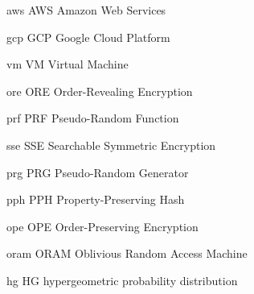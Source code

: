 
\newacronym%
	{aws}
	{AWS}
	{Amazon Web Services}

\newacronym%
	{gcp}
	{GCP}
	{Google Cloud Platform}

\newacronym%
	{vm}
	{VM}
	{Virtual Machine}

\newacronym%
	{ore}
	{ORE}
	{Order-Revealing Encryption}

\newacronym%
	{prf}
	{PRF}
	{Pseudo-Random Function}

\newacronym%
	{sse}
	{SSE}
	{Searchable Symmetric Encryption}

\newacronym%
	{prg}
	{PRG}
	{Pseudo-Random Generator}

\newacronym%
	{pph}
	{PPH}
	{Property-Preserving Hash}

\newacronym%
	{ope}
	{OPE}
	{Order-Preserving Encryption}

\newacronym%
	{oram}
	{ORAM}
	{Oblivious Random Access Machine}

\newacronym%
	{hg}
	{HG}
	{hypergeometric probability distribution}

